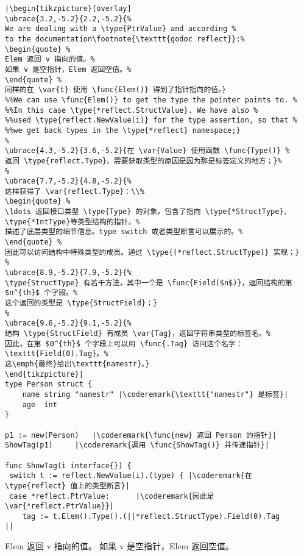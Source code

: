 \begin{lstlisting}[caption=使用反射自省,label=src:introspection]
|\begin{tikzpicture}[overlay]
\ubrace{3.2,-5.2}{2.2,-5.2}{%
We are dealing with a \type{PtrValue} and according %
to the documentation\footnote{\texttt{godoc reflect}}:%
\begin{quote} %
Elem 返回 v 指向的值。%
如果 v 是空指针，Elem 返回空值。%
\end{quote} %
同样的在 \var{t} 使用 \func{Elem()} 得到了指针指向的值。}
%%We can use \func{Elem()} to get the type the pointer points to. %
%%In this case \type{*reflect.StructValue}. We have also %
%%used \type{reflect.NewValue(i)} for the type assertion, so that %
%%we get back types in the \type{*reflect} namespace;}
%
\ubrace{4.3,-5.2}{3.6,-5.2}{在 \var{Value} 使用函数 \func{Type()} %
返回 \type{reflect.Type}。需要获取类型的原因是因为那是标签定义的地方；}%
%
\ubrace{7.7,-5.2}{4.8,-5.2}{%
这样获得了 \var{reflect.Type}：\\%
\begin{quote} %
\ldots 返回接口类型 \type{Type} 的对象。包含了指向 \type{*StructType}、\type{*IntType}等类型结构的指针。%
描述了底层类型的细节信息。type switch 或者类型断言可以展示的。%
\end{quote} %
因此可以访问结构中特殊类型的成员。通过 \type{(*reflect.StructType)} 实现；}
%
\ubrace{8.9,-5.2}{7.9,-5.2}{%
\type{StructType} 有若干方法，其中一个是 \func{Field($n$)}，返回结构的第 $n^{th}$ 个字段。%
这个返回的类型是 \type{StructField}；}
%
\ubrace{9.6,-5.2}{9.1,-5.2}{%
结构 \type{StructField} 有成员 \var{Tag}，返回字符串类型的标签名。%
因此，在第 $0^{th}$ 个字段上可以用 \func{.Tag} 访问这个名字：\texttt{Field(0).Tag}。%
这\emph{最终}给出\texttt{namestr}。}
\end{tikzpicture}|
type Person struct {
    name string "namestr" |\coderemark{\texttt{"namestr"} 是标签}|
    age  int
}

p1 := new(Person)   |\coderemark{\func{new} 返回 Person 的指针}|
ShowTag(p1)	    |\coderemark{调用 \func{ShowTag()} 并传递指针}|

func ShowTag(i interface{}) {
 switch t := reflect.NewValue(i).(type) { |\coderemark{在 \type{reflect} 值上的类型断言}|
 case *reflect.PtrValue:	  |\coderemark{因此是 \var{*reflect.PtrValue}}|
	tag := t.Elem().Type().(||*reflect.StructType).Field(0).Tag
||
\end{lstlisting}
Elem 返回 v 指向的值。%
如果 v 是空指针，Elem 返回空值。%
